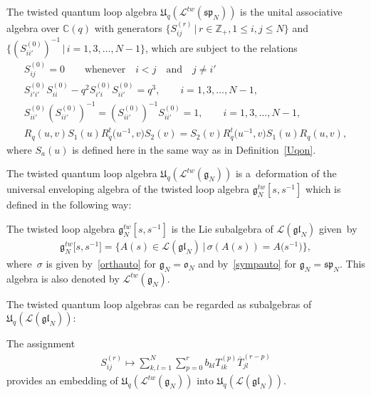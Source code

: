 \documentclass[pdftex]{sigma}
\numberwithin{theorem}{section}
\numberwithin{proposition}{section}
\numberwithin{lemma}{section}
\numberwithin{corollary}{section}
\numberwithin{definition}{section}
\numberwithin{example}{section}
\numberwithin{remark}{section}
\numberwithin{note}{section}
\numberwithin{equation}{section}
\begin{document}
\begin{definition}
The twisted quantum loop algebra $\mathfrak{U}_q(\mathcal{L}^{tw}(\mathfrak{sp}_N))$ is the unital associative algebra
over $\mathbb{C}(q)$ with generators $\big\{S_{ij}^{(r)} \,|\, r \in \mathbb{Z}_+, 1 \leq i, j \leq N\big\}$ and
$\big\{(S_{ii'}^{(0)})^{-1} \,|\, i=1,3,\ldots,N{-}1\big\}$, which are subject to the relations
\begin{gather*}
S_{ij}^{(0)}=0 \qquad \text{whenever} \quad i<j \quad \text{and} \quad j \neq i'
\\
S_{i'i'}^{(0)}S_{ii}^{(0)}-q^2S_{i'i}^{(0)}S_{ii'}^{(0)}=q^3, \qquad i=1, 3, \ldots, N-1,
\\
S_{ii'}^{(0)}(S_{ii'}^{(0)})^{-1}=(S_{ii'}^{(0)})^{-1}S_{ii'}^{(0)}=1, \qquad i=1, 3, \ldots, N-1,
\\
R_q(u,v)S_1(u)R_q^t\big(u^{-1},v\big)S_2(v)=S_2(v)R_q^t\big(u^{-1},v\big)S_1(u)R_q(u,v),
\end{gather*}
where $S_a(u)$ is def\/ined here in the same way as in Def\/inition~\ref{Uqon}.
\end{definition}

The twisted quantum loop algebra $\mathfrak{U}_q(\mathcal{L}^{tw}(\mathfrak{g}_N))$ is a~deformation of the universal
enveloping algebra of the twisted loop algebra $\mathfrak{g}_N^{tw}[s,s^{-1}]$ which is def\/ined in the following way:

\begin{definition}
The twisted loop algebra $\mathfrak{g}_N^{tw}[s,s^{-1}]$ is the Lie subalgebra of
$\mathcal{L}(\mathfrak{gl}_N)$ given~by
\begin{gather*}
\mathfrak{g}_N^{tw}\big[s,s^{-1}\big]=\big\{A(s) \in \mathcal{L}(\mathfrak{gl}_N) \,|\, \sigma(A(s))=A\big(s^{-1}\big)\big\},
\end{gather*}
where~$\sigma$ is given by~\eqref{orthauto} for $\mathfrak{g}_N=\mathfrak{o}_N$ and by~\eqref{sympauto} for
$\mathfrak{g}_N=\mathfrak{sp}_N$.
This algebra is also denoted by $\mathcal{L}^{tw}(\mathfrak{g}_N)$.
\end{definition}

The twisted quantum loop algebras can be regarded as subalgebras of
$\mathfrak{U}_q(\mathcal{L}(\mathfrak{gl}_N))$:

\begin{proposition}\label{embU}
The assignment
\begin{gather*}
S_{ij}^{(r)} \mapsto \sum\limits_{k,l=1}^N \sum\limits_{p=0}^r b_{kl} T_{ik}^{(p)} \overline{T}_{jl}^{(r-p)}
\end{gather*}
provides an embedding of $\mathfrak{U}_q(\mathcal{L}^{tw}(\mathfrak{g}_N))$ into
$\mathfrak{U}_q(\mathcal{L}(\mathfrak{gl}_N))$.
\end{proposition}
\end{document}

